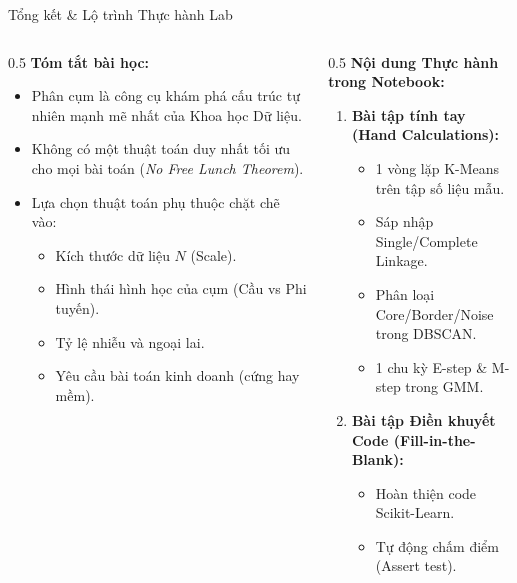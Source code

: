 \documentclass[aspectratio=169,10pt]{beamer}
\begin{document}
\begin{frame}{Tổng kết \& Lộ trình Thực hành Lab}
  \begin{columns}[T]
    \begin{column}{0.5\textwidth}
      \textbf{Tóm tắt bài học:}
      \begin{itemize}\setlength{\itemsep}{2pt}
        \item Phân cụm là công cụ khám phá cấu trúc tự nhiên mạnh mẽ nhất của Khoa học Dữ liệu.
        \item Không có một thuật toán duy nhất tối ưu cho mọi bài toán (\textit{No Free Lunch Theorem}).
        \item Lựa chọn thuật toán phụ thuộc chặt chẽ vào:
          \begin{itemize}\setlength{\itemsep}{1pt}
            \item Kích thước dữ liệu $N$ (Scale).
            \item Hình thái hình học của cụm (Cầu vs Phi tuyến).
            \item Tỷ lệ nhiễu và ngoại lai.
            \item Yêu cầu bài toán kinh doanh (cứng hay mềm).
          \end{itemize}
      \end{itemize}
    \end{column}
    \begin{column}{0.5\textwidth}
      \textbf{Nội dung Thực hành trong Notebook:}
      \begin{enumerate}\setlength{\itemsep}{2pt}
        \item \textbf{Bài tập tính tay (Hand Calculations):}
          \begin{itemize}
            \item 1 vòng lặp K-Means trên tập số liệu mẫu.
            \item Sáp nhập Single/Complete Linkage.
            \item Phân loại Core/Border/Noise trong DBSCAN.
            \item 1 chu kỳ E-step \& M-step trong GMM.
          \end{itemize}
        \item \textbf{Bài tập Điền khuyết Code (Fill-in-the-Blank):}
          \begin{itemize}
            \item Hoàn thiện code Scikit-Learn.
            \item Tự động chấm điểm (Assert test).
          \end{itemize}
      \end{enumerate}
    \end{column}
  \end{columns}
\end{frame}
\end{document}
